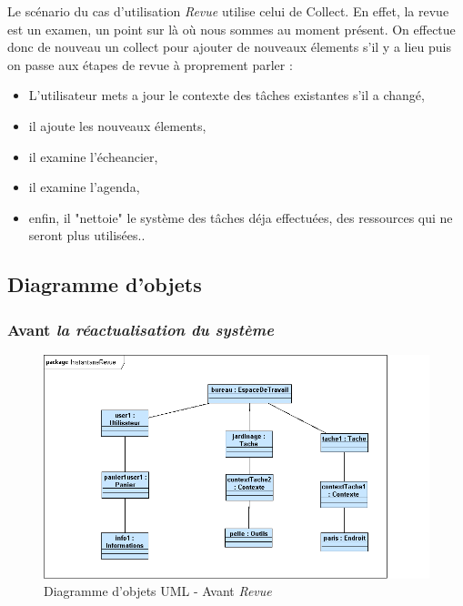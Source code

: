 	\bigskip
	
	Le scénario du cas d'utilisation \textit{Revue} utilise celui de Collect. En effet, la revue est un examen, un point sur là où nous sommes au moment présent. On effectue donc de nouveau un collect pour ajouter de nouveaux élements s'il y a lieu puis on passe aux étapes de revue à proprement parler : \\
	\begin{itemize}
\item L'utilisateur mets a jour le contexte des tâches existantes s'il a changé,
\item il ajoute les nouveaux élements,
\item il examine l'écheancier,
\item il examine l'agenda,
\item enfin, il "nettoie" le système des tâches déja effectuées, des ressources qui ne seront plus utilisées..
\end{itemize}
	
\subsection*{Diagramme d'objets}

\subsubsection {Avant \textit{la réactualisation du système}}

\begin{figure}[H]
	\begin{center}
	\includegraphics[scale=0.5]{diagrams/InstantaneRevueBefore.png}
	\caption{Diagramme d'objets UML  - Avant \textit{Revue} }
	\end{center}
	\end{figure}
	
